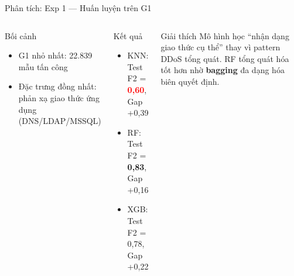 \documentclass[aspectratio=169,12pt]{beamer}
\newcommand{\good}[1]{\textcolor{mygreen}{\textbf{#1}}}
\newcommand{\bad}[1]{\textcolor{red}{\textbf{#1}}}
\begin{document}
\begin{frame}{Phân tích: Exp 1 --- Huấn luyện trên G1}
  \begin{columns}[T]
      \begin{block}{Bối cảnh}
        \begin{itemize}
          \item G1 nhỏ nhất: 22.839 mẫu tấn công
          \item Đặc trưng đồng nhất: phản xạ giao thức ứng dụng (DNS/LDAP/MSSQL)
        \end{itemize}
      \end{block}
      \vspace{0.3em}
      \begin{alertblock}{Kết quả}
        \begin{itemize}
          \item KNN: Test F2 = \bad{0,60}, Gap +0,39
          \item RF:  Test F2 = \good{0,83}, Gap +0,16
          \item XGB: Test F2 = 0,78, Gap +0,22
        \end{itemize}
      \end{alertblock}
      \begin{block}{Giải thích}
        Mô hình học ``nhận dạng giao thức cụ thể'' thay vì pattern DDoS tổng quát.
        RF tổng quát hóa tốt hơn nhờ \textbf{bagging} đa dạng hóa biên quyết định.
      \end{block}
  \end{columns}
\end{frame}
\end{document}
